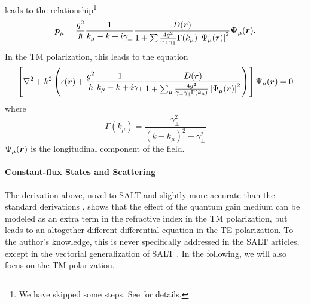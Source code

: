leads to the relationship\footnote{We have skipped some steps. See \cite[\S2.2]{GE2010b} for details.}
  \begin{equation}
   \boldsymbol{p}_\mu = \frac{g^2}{\hbar}\frac{1}{k_\mu-k+i\gamma_\perp}\frac{D(\boldsymbol{r})}{1+\sum\frac{4g^2}{\gamma_\perp\gamma_\parallel}\Gamma(k_\mu)\left|\Psi_\mu(\boldsymbol{r})\right|^2}\boldsymbol{\Psi}_\mu(\boldsymbol{r}).
  \end{equation}
In the TM polarization, this leads to the equation
  \begin{equation}
   \left[\nabla^2+k^2\left(\epsilon(\boldsymbol{r})+\frac{g^2}{\hbar}\frac{1}{k_\mu-k+i\gamma_\perp}\frac{D(\boldsymbol{r})}{1+\sum_\mu\frac{4g^2}{\gamma_\perp\gamma_\parallel\Gamma(k_\mu)}\left|\Psi_\mu(\boldsymbol{r})\right|^2}\right)\right]\Psi_\mu(\boldsymbol{r})=0
  \end{equation}
where
	\begin{equation}
		\Gamma(k_\mu) = \frac{\gamma_\perp^2}{(k-k_\mu)^2-\gamma_\perp^2}
	\end{equation}
$\Psi_\mu(\boldsymbol{r})$ is the longitudinal component of the field. 

\paragraph{Constant-flux States and Scattering}
The derivation above, novel to SALT and slightly more accurate
than the standard derivations \cite{GE2010a,GE2010b,EST2013}, shows
that the effect of the quantum gain medium can be modeled as an extra
term in the refractive index in the TM polarization, but leads to an altogether
different differential equation in the TE polarization. To the author's knowledge,
this is never specifically addressed in the SALT articles, except in the vectorial
generalization of SALT \cite{GE2010b}. In the following, we will also focus on the
TM polarization. 

